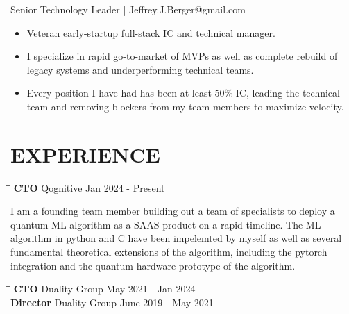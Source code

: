 \documentclass{res}
\begin{document}
\begin{resume}
\vspace{-28pt}
\begin{center}
\Large Senior Technology Leader | Jeffrey.J.Berger@gmail.com\\
\end{center}

\begin{itemize}
\item Veteran early-startup full-stack IC and technical manager.
\item I specialize in rapid go-to-market of MVPs as well as complete rebuild of legacy systems and underperforming technical teams.
\item Every position I have had has been at least 50\% IC, leading the technical team and removing blockers from my team members to maximize velocity.
\end{itemize}
\vspace{-2pt}

\section{EXPERIENCE}

\vspace{-8pt}
\begin{tabbing}
   \hspace{2.0in}\= \hspace{2.2in}\= \kill %
{\bf CTO } \> Qognitive \> Jan 2024 - Present
\end{tabbing}\vspace{-15pt}

I am a founding team member building out a team of specialists to deploy a quantum ML algorithm as a SAAS product on a rapid timeline. The ML algorithm in python and C have been impelemted by myself as well as several fundamental theoretical extensions of the algorithm, including the pytorch integration and the quantum-hardware prototype of the algorithm.

\vspace{-8pt}
\begin{tabbing}
   \hspace{2.0in}\= \hspace{2.2in}\= \kill %
{\bf CTO } \> Duality Group \> May 2021 - Jan 2024 \\
{\bf Director } \> Duality Group \> June 2019 - May 2021
\end{tabbing}\vspace{-15pt}


\end{resume}
\end{document}
